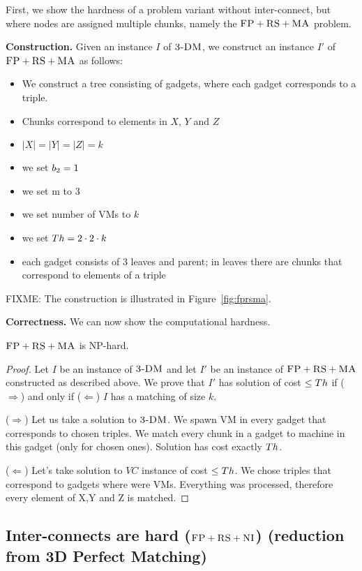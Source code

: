 First, we show the hardness of a problem variant without inter-connect,
but where nodes are assigned multiple chunks, namely the $\textsc{FP}+\textsc{RS}+\textsc{MA}$
problem.

\textbf{Construction.}
Given an instance $I$ of $\textsc{3-DM}$, we construct an instance $I'$ of
$\textsc{FP}+\textsc{RS}+\textsc{MA}$ as follows:
\begin{itemize}
\item We construct a tree consisting of gadgets, where each gadget corresponds to a triple.
\item Chunks correspond to elements in $X$, $Y$ and $Z$
\item $|X| = |Y| = |Z| = k$
\item we set $b_2=1$
\item we set m to 3
\item we set number of VMs to $k$
\item we set $Th=2 \cdot 2 \cdot k$
\item each gadget consists of 3 leaves and parent; in leaves there are
  chunks that correspond to elements of a triple
\end{itemize}

FIXME: The construction is illustrated in Figure~\ref{fig:fprsma}.

\textbf{Correctness.}
We can now show the computational hardness.
\begin{theorem}
$\textsc{FP}+\textsc{RS}+\textsc{MA}$ is NP-hard.
\end{theorem}
\begin{proof}
Let $I$ be an instance of $\textsc{3-DM}$ and let $I'$ be an instance of
$\textsc{FP}+\textsc{RS}+\textsc{MA}$ constructed as described above.
We prove that $I'$ has solution of cost $\leq Th$ if ($\Rightarrow$) and only if
($\Leftarrow$)
$I$ has a matching of size $k$.

($\Rightarrow$) Let us take a solution to $\textsc{3-DM}$. We spawn VM in every
gadget that corresponds to chosen triples. We match every chunk in a
gadget to machine in this gadget (only for chosen ones). Solution has
cost exactly $Th$.

($\Leftarrow$) Let's take solution to $VC$ instance of cost $\leq Th$. We
chose triples that correspond to gadgets where were VMs. Everything
was processed, therefore every element of X,Y and Z is matched.
\end{proof}


\subsection{Inter-connects are hard ($\textsc{FP}+\textsc{RS}+\textsc{NI}$) (reduction from 3D Perfect Matching)}\label{ssec:fprscc}


